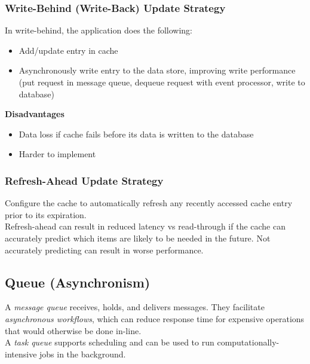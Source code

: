 \documentclass[12pt, titlepage]{article}
\begin{document}
\subsubsection{Write-Behind (Write-Back) Update Strategy}

In write-behind, the application does the following:

\begin{itemize}
  \item Add/update entry in cache
  \item Asynchronously write entry to the data store, improving write performance (put request in message queue, dequeue request with event processor, write to database)
\end{itemize}

\textbf{Disadvantages}
\begin{itemize}
  \item Data loss if cache fails before its data is written to the database
  \item Harder to implement
\end{itemize}

\subsubsection{Refresh-Ahead Update Strategy}

Configure the cache to automatically refresh any recently accessed cache entry prior to its expiration. \\

Refresh-ahead can result in reduced latency vs read-through if the cache can accurately predict which items are likely to be needed in the future. Not accurately predicting can result in worse performance.

\subsection{Queue (Asynchronism)}

A \textit{message queue} receives, holds, and delivers messages. They facilitate \textit{asynchronous workflows}, which can reduce response time for expensive operations that would otherwise be done in-line. \\

A \textit{task queue} supports scheduling and can be used to run computationally-intensive jobs in the background.
\end{document}
